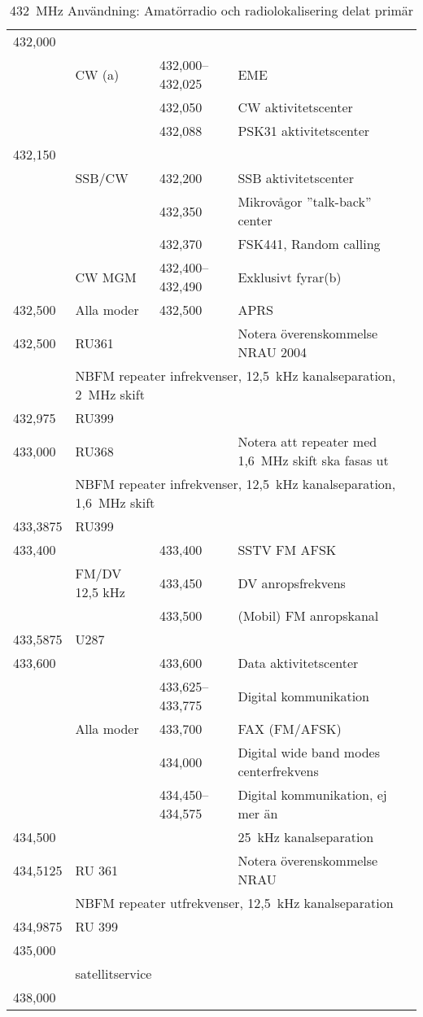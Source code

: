 \setlongtables
\begin{longtable}{llll}
\caption{432~MHz Användning: Amatörradio och radiolokalisering delat primär} \\
432,000 &        & &\\
        & CW (a) & 432,000--432,025 & EME\\
        &        & 432,050 & CW aktivitetscenter\\
        & & 432,088 & PSK31 aktivitetscenter\\
432,150 & & & \\
        & SSB/CW & 432,200 & SSB aktivitetscenter\\
        & & 432,350 & Mikrovågor ''talk-back'' center\\
        & & 432,370 & FSK441, Random calling\\
        & CW MGM & 432,400--432,490 & Exklusivt fyrar(b)\\
432,500 & Alla moder & 432,500 & APRS\\
432,500 & RU361 & & Notera överenskommelse NRAU 2004\\
 & \multicolumn{3}{l}{NBFM repeater infrekvenser, 12,5~kHz kanalseparation, 2~MHz skift}\\
432,975 & RU399 & & \\
433,000 & RU368 & & Notera att repeater med 1,6~MHz skift ska fasas ut\\
 & \multicolumn{3}{l}{NBFM repeater infrekvenser, 12,5~kHz kanalseparation, 1,6~MHz skift}\\
433,3875 & RU399 & & \\
433,400 & & 433,400 & SSTV FM AFSK\\
        & FM/DV 12,5 kHz & 433,450 & DV anropsfrekvens\\
        & & 433,500 & (Mobil) FM anropskanal\\
433,5875 & U287 & & \\
433,600 &            & 433,600           & Data aktivitetscenter\\
        &            & 433,625--433,775 & Digital kommunikation \\
        & Alla moder & 433,700           & FAX (FM/AFSK)\\
        & & 434,000 & Digital wide band modes centerfrekvens\\
        &            & 434,450--434,575 & Digital kommunikation, ej mer än\\
434,500 &            &                   & 25~kHz kanalseparation\\
434,5125 & RU 361 & & Notera överenskommelse NRAU\\
        & \multicolumn{3}{l}{NBFM repeater utfrekvenser, 12,5~kHz kanalseparation}\\
434,9875 & RU 399 & & \\
435,000 & & & \\
        & \multicolumn{3}{l}{satellitservice} \\
438,000 & & & \\
\end{longtable}

